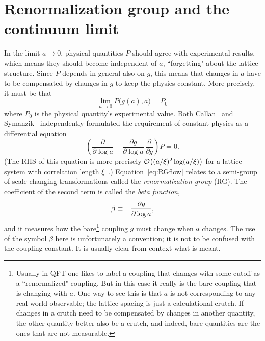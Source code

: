 \section{Renormalization group and the continuum limit}


In the limit $a\to0$, physical quantities $P$ should agree with experimental
results, which means they should become independent of $a$, ``forgetting"
about the lattice structure. Since $P$ depends in general also on $g$,
this means that changes in $a$ have to be compensated by changes in $g$
to keep the physics constant. More precisely, it must be that 
\begin{equation}
  \lim_{a\to0}P\Big(g(a),a\Big)=P_0
\end{equation}
where $P_0$ is the physical quantity's experimental value.
Both Callan~\cite{callan_broken_1970} and
Symanzik~\cite{symanzik_small_1970,symanzik_small-distance-behaviour_1971}
independently formulated the requirement of constant physics as
a differential equation
\begin{equation}\label{eq:RGflow}
  \left(\frac{\partial}{\partial\log a}
        +\frac{\partial g}{\partial\log a}
         \,\frac{\partial}{\partial g}\right)P=0. 
\end{equation}
(The RHS of this equation is more precisely
$\order{(a/\xi)^2\log(a/\xi)}$ for a lattice system
with correlation length $\xi$~\cite{montvay_quantum_1994}.)
Equation~\eqref{eq:RGflow} relates to a semi-group of scale 
changing transformations called the {\it renormalization group} (RG). 
The coefficient of the second term is called the {\it beta function},
\begin{equation}\label{eq:betafunction}\index{beta function}
  \beta\equiv-\frac{\partial g}{\partial\log a},
\end{equation}
and it measures how the bare\footnote{Usually in QFT one likes to label
a coupling that changes with some cutoff as a ``renormalized" coupling.
But in this case it really is the bare coupling that is changing with $a$.
One way to see this is that $a$ is not corresponding to any real-world
observable; the lattice spacing is just a calculational crutch. If changes
in a crutch need to be compensated by changes in another quantity,
the other quantity better also be a crutch, and indeed, bare quantities
are the ones that are not measurable.}
coupling $g$ must change when $a$ changes.
The use of the symbol $\beta$ here is unfortunately a convention; it
is not to be confused with the coupling constant. It is usually clear
from context what is meant. 


